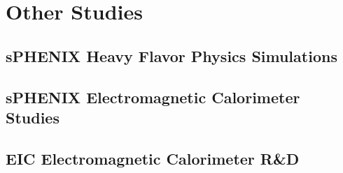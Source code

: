 \chapter{Other Studies}

\section{sPHENIX Heavy Flavor Physics Simulations}


\section{sPHENIX Electromagnetic Calorimeter Studies}


\section{EIC Electromagnetic Calorimeter R\&D}
